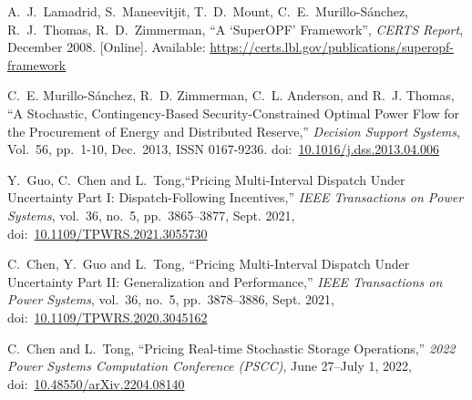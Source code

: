 \documentclass[12pt]{article}
\newcommand{\doi}[1]{doi:~\href{https://doi.org/#1}{#1}}
\numberwithin{equation}{section}
\numberwithin{table}{section}
\numberwithin{figure}{section}
\begin{document}
\begin{thebibliography}{99}
A.~J.~Lamadrid, S.~Maneevitjit, T.~D.~Mount, C.~E.~Murillo-S{\'a}nchez,
  R.~J.~Thomas, R.~D.~Zimmerman, ``A `SuperOPF' Framework'', \emph{CERTS
  Report}, December 2008.
  [Online]. Available: \url{https://certs.lbl.gov/publications/superopf-framework}

C.~E. Murillo-S{\'a}nchez, R.~D. Zimmerman, C.~L. Anderson, and R.~J. Thomas, ``A Stochastic, Contingency-Based Security-Constrained Optimal Power Flow for the Procurement of Energy and Distributed Reserve,'' \emph{Decision Support Systems}, Vol.~56, pp.~1-10, Dec.~2013, ISSN 0167-9236.
\doi{10.1016/j.dss.2013.04.006}

Y.~Guo, C.~Chen and L.~Tong,``Pricing Multi-Interval Dispatch Under Uncertainty Part I: Dispatch-Following Incentives,'' \emph{IEEE Transactions on Power Systems}, vol.~36, no.~5, pp.~3865--3877, Sept. 2021, \doi{10.1109/TPWRS.2021.3055730}

C.~Chen, Y.~Guo and L.~Tong, ``Pricing Multi-Interval Dispatch Under Uncertainty Part II: Generalization and Performance,'' \emph{IEEE Transactions on Power Systems}, vol.~36, no.~5, pp.~3878--3886, Sept. 2021, \doi{10.1109/TPWRS.2020.3045162}

C.~Chen and L.~Tong, ``Pricing Real-time Stochastic Storage Operations,'' \emph{2022 Power Systems Computation Conference (PSCC)}, June 27--July 1, 2022, \doi{10.48550/arXiv.2204.08140}

\end{thebibliography}
\end{document}
